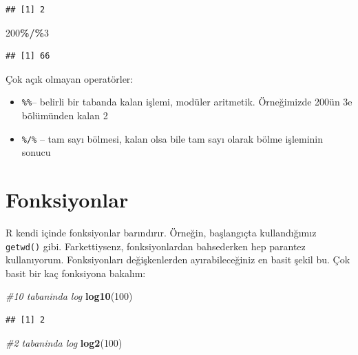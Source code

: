 \documentclass[
]{book}
\newenvironment{Shaded}{\begin{snugshade}}{\end{snugshade}}
\newcommand{\CommentTok}[1]{\textcolor[rgb]{0.56,0.35,0.01}{\textit{#1}}}
\newcommand{\DecValTok}[1]{\textcolor[rgb]{0.00,0.00,0.81}{#1}}
\newcommand{\KeywordTok}[1]{\textcolor[rgb]{0.13,0.29,0.53}{\textbf{#1}}}
\newcommand{\NormalTok}[1]{#1}
\newcommand{\OperatorTok}[1]{\textcolor[rgb]{0.81,0.36,0.00}{\textbf{#1}}}
\providecommand{\tightlist}{%
  \setlength{\itemsep}{0pt}\setlength{\parskip}{0pt}}
\begin{document}
\begin{verbatim}
## [1] 2
\end{verbatim}

\begin{Shaded}
\begin{Highlighting}[]
\DecValTok{200}\OperatorTok{\%/\%}\DecValTok{3}
\end{Highlighting}
\end{Shaded}

\begin{verbatim}
## [1] 66
\end{verbatim}

Çok açık olmayan operatörler:

\begin{itemize}
\tightlist
\item
  \texttt{\%\%}-- belirli bir tabanda kalan işlemi, modüler aritmetik. Örneğimizde 200ün 3e bölümünden kalan 2
\item
  \texttt{\%/\%} -- tam sayı bölmesi, kalan olsa bile tam sayı olarak bölme işleminin sonucu
\end{itemize}

\hypertarget{fonksiyonlar}{%
\section{Fonksiyonlar}\label{fonksiyonlar}}

R kendi içinde fonksiyonlar barındırır. Örneğin, başlangıçta kullandığımız \texttt{getwd()} gibi. Farkettiysenz, fonksiyonlardan bahsederken hep parantez kullanıyorum. Fonksiyonları değişkenlerden ayırabileceğiniz en basit şekil bu. Çok basit bir kaç fonksiyona bakalım:

\begin{Shaded}
\begin{Highlighting}[]
\CommentTok{\#10 tabaninda log}
\KeywordTok{log10}\NormalTok{(}\DecValTok{100}\NormalTok{) }
\end{Highlighting}
\end{Shaded}

\begin{verbatim}
## [1] 2
\end{verbatim}

\begin{Shaded}
\begin{Highlighting}[]
\CommentTok{\#2 tabaninda log}
\KeywordTok{log2}\NormalTok{(}\DecValTok{100}\NormalTok{)}
\end{Highlighting}
\end{Shaded}
\end{document}
